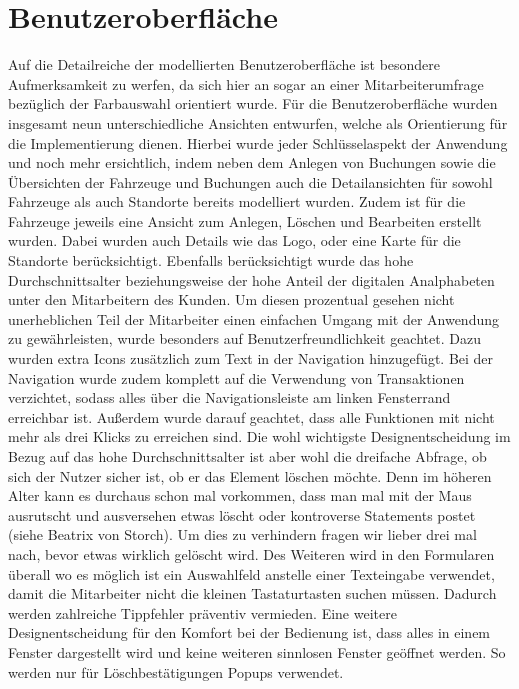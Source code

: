 \section{Benutzeroberfläche}
Auf die Detailreiche der modellierten Benutzeroberfläche ist besondere Aufmerksamkeit zu werfen, da sich hier an sogar an einer Mitarbeiterumfrage bezüglich der Farbauswahl orientiert wurde. Für die Benutzeroberfläche wurden insgesamt neun unterschiedliche Ansichten entwurfen, welche als Orientierung für die Implementierung dienen. Hierbei wurde jeder Schlüsselaspekt der Anwendung und noch mehr ersichtlich, indem neben dem Anlegen von Buchungen sowie die Übersichten der Fahrzeuge und Buchungen auch die Detailansichten für sowohl Fahrzeuge als auch Standorte bereits modelliert wurden. Zudem ist für die Fahrzeuge jeweils eine Ansicht zum Anlegen, Löschen und Bearbeiten erstellt wurden. Dabei wurden auch Details wie das Logo, oder eine Karte für die Standorte berücksichtigt. Ebenfalls berücksichtigt wurde das hohe Durchschnittsalter beziehungsweise der hohe Anteil der digitalen Analphabeten unter den Mitarbeitern des Kunden. Um diesen prozentual gesehen nicht unerheblichen Teil der Mitarbeiter einen einfachen Umgang mit der Anwendung zu gewährleisten, wurde besonders auf Benutzerfreundlichkeit geachtet. Dazu wurden extra Icons zusätzlich zum Text in der Navigation hinzugefügt. Bei der Navigation wurde zudem komplett auf die Verwendung von Transaktionen verzichtet, sodass alles über die Navigationsleiste am linken Fensterrand erreichbar ist. Außerdem wurde darauf geachtet, dass alle Funktionen mit nicht mehr als drei Klicks zu erreichen sind. Die wohl wichtigste Designentscheidung im Bezug auf das hohe Durchschnittsalter ist aber wohl die dreifache Abfrage, ob sich der Nutzer sicher ist, ob er das Element löschen möchte. Denn im höheren Alter kann es durchaus schon mal vorkommen, dass man mal mit der Maus ausrutscht und ausversehen etwas löscht oder kontroverse Statements postet (siehe Beatrix von Storch). Um dies zu verhindern fragen wir lieber drei mal nach, bevor etwas wirklich gelöscht wird. Des Weiteren wird in den Formularen überall wo es möglich ist ein Auswahlfeld anstelle einer Texteingabe verwendet, damit die Mitarbeiter nicht die kleinen Tastaturtasten suchen müssen. Dadurch werden zahlreiche Tippfehler präventiv vermieden. Eine weitere Designentscheidung für den Komfort bei der Bedienung ist, dass alles in einem Fenster dargestellt wird und keine weiteren sinnlosen Fenster geöffnet werden. So werden nur für  Löschbestätigungen Popups verwendet.

